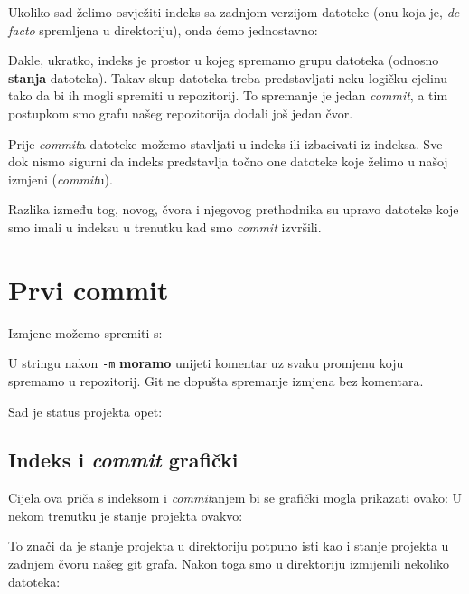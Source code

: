 Ukoliko sad želimo osvježiti indeks sa zadnjom verzijom datoteke (onu koja je, \emph{de facto} spremljena u direktoriju), onda ćemo jednostavno:


Dakle, ukratko, indeks je prostor u kojeg spremamo grupu datoteka (odnosno \textbf{stanja} datoteka).
Takav skup datoteka treba predstavljati neku logičku cjelinu tako da bi ih mogli spremiti u repozitorij.
To spremanje je jedan \emph{commit}, a tim postupkom smo grafu našeg repozitorija dodali još jedan čvor. 

Prije \emph{commit}a datoteke možemo stavljati u indeks ili izbacivati iz indeksa.
Sve dok nismo sigurni da indeks predstavlja točno one datoteke koje želimo u našoj izmjeni (\emph{commit}u).

Razlika između tog, novog, čvora i njegovog prethodnika su upravo datoteke koje smo imali u indeksu u trenutku kad smo \emph{commit} izvršili.

\section*{Prvi commit}

Izmjene možemo spremiti s:


U stringu nakon \verb+-m+ \textbf{moramo} unijeti komentar uz svaku promjenu koju spremamo u repozitorij.
Git ne dopušta spremanje izmjena bez komentara.

Sad je status projekta opet:



\subsection*{Indeks i \emph{commit} grafički}

Cijela ova priča s indeksom i \emph{commit}anjem bi se grafički mogla prikazati ovako:
U nekom trenutku je stanje projekta ovakvo:



To znači da je stanje projekta u direktoriju potpuno isti kao i stanje projekta u zadnjem čvoru našeg git grafa.
Nakon toga smo u direktoriju izmijenili nekoliko datoteka:



